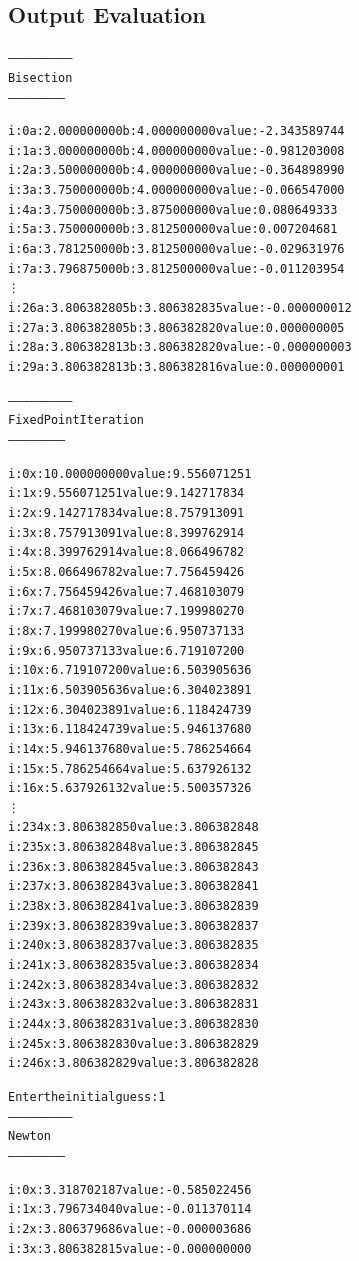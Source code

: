 \documentclass[11pt]{article} %
\begin{document}
\subsection*{Output Evaluation}
\begin{alltt}
--------------------------
 Bisection
 -----------------------


i: 0	a: 2.000000000	b: 4.000000000	value: -2.343589744 
i: 1	a: 3.000000000	b: 4.000000000	value: -0.981203008 
i: 2	a: 3.500000000	b: 4.000000000	value: -0.364898990 
i: 3	a: 3.750000000	b: 4.000000000	value: -0.066547000 
i: 4	a: 3.750000000	b: 3.875000000	value: 0.080649333 
i: 5	a: 3.750000000	b: 3.812500000	value: 0.007204681 
i: 6	a: 3.781250000	b: 3.812500000	value: -0.029631976 
i: 7	a: 3.796875000	b: 3.812500000	value: -0.011203954 
\vdots
i: 26	a: 3.806382805	b: 3.806382835	value: -0.000000012 
i: 27	a: 3.806382805	b: 3.806382820	value: 0.000000005 
i: 28	a: 3.806382813	b: 3.806382820	value: -0.000000003 
i: 29	a: 3.806382813	b: 3.806382816	value: 0.000000001 

--------------------------
 Fixed Point Iteration
 -----------------------


i: 0	x: 10.000000000	value: 9.556071251
i: 1	x: 9.556071251	value: 9.142717834
i: 2	x: 9.142717834	value: 8.757913091
i: 3	x: 8.757913091	value: 8.399762914
i: 4	x: 8.399762914	value: 8.066496782
i: 5	x: 8.066496782	value: 7.756459426
i: 6	x: 7.756459426	value: 7.468103079
i: 7	x: 7.468103079	value: 7.199980270
i: 8	x: 7.199980270	value: 6.950737133
i: 9	x: 6.950737133	value: 6.719107200
i: 10	x: 6.719107200	value: 6.503905636
i: 11	x: 6.503905636	value: 6.304023891
i: 12	x: 6.304023891	value: 6.118424739
i: 13	x: 6.118424739	value: 5.946137680
i: 14	x: 5.946137680	value: 5.786254664
i: 15	x: 5.786254664	value: 5.637926132
i: 16	x: 5.637926132	value: 5.500357326
\vdots
i: 234	x: 3.806382850	value: 3.806382848
i: 235	x: 3.806382848	value: 3.806382845
i: 236	x: 3.806382845	value: 3.806382843
i: 237	x: 3.806382843	value: 3.806382841
i: 238	x: 3.806382841	value: 3.806382839
i: 239	x: 3.806382839	value: 3.806382837
i: 240	x: 3.806382837	value: 3.806382835
i: 241	x: 3.806382835	value: 3.806382834
i: 242	x: 3.806382834	value: 3.806382832
i: 243	x: 3.806382832	value: 3.806382831
i: 244	x: 3.806382831	value: 3.806382830
i: 245	x: 3.806382830	value: 3.806382829
i: 246	x: 3.806382829	value: 3.806382828


Enter the initial guess: 1 
--------------------------
 Newton
 -----------------------


i: 0	x: 3.318702187	value: -0.585022456
i: 1	x: 3.796734040	value: -0.011370114
i: 2	x: 3.806379686	value: -0.000003686
i: 3	x: 3.806382815	value: -0.000000000

\end{alltt}
\end{document}
